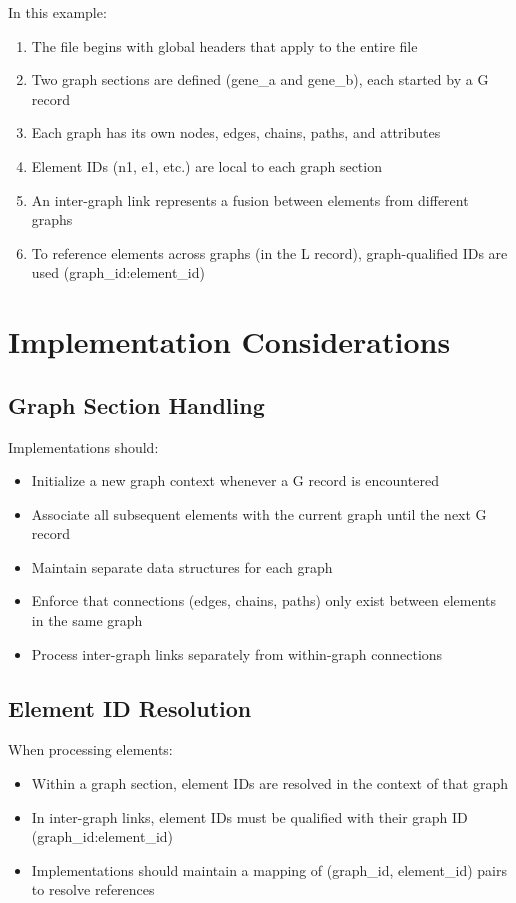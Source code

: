 \documentclass{article}
\begin{document}
In this example:

\begin{enumerate}
	\item The file begins with global headers that apply to the entire file
	\item Two graph sections are defined (gene\_a and gene\_b), each started by a G record
	\item Each graph has its own nodes, edges, chains, paths, and attributes
	\item Element IDs (n1, e1, etc.) are local to each graph section
	\item An inter-graph link represents a fusion between elements from different graphs
	\item To reference elements across graphs (in the L record), graph-qualified IDs are used (graph\_id:element\_id)
\end{enumerate}

\section{Implementation Considerations}

\subsection{Graph Section Handling}

Implementations should:

\begin{itemize}
	\item Initialize a new graph context whenever a G record is encountered
	\item Associate all subsequent elements with the current graph until the next G record
	\item Maintain separate data structures for each graph
	\item Enforce that connections (edges, chains, paths) only exist between elements in the same graph
	\item Process inter-graph links separately from within-graph connections
\end{itemize}

\subsection{Element ID Resolution}

When processing elements:

\begin{itemize}
	\item Within a graph section, element IDs are resolved in the context of that graph
	\item In inter-graph links, element IDs must be qualified with their graph ID (graph\_id:element\_id)
	\item Implementations should maintain a mapping of (graph\_id, element\_id) pairs to resolve references
\end{itemize}
\end{document}
